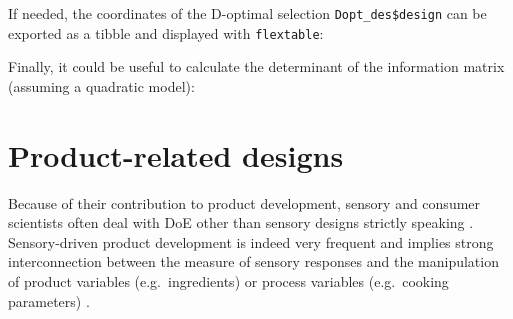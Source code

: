 \documentclass[
]{krantz}
\makeatletter
\newenvironment{Shaded}{\begin{snugshade}}{\end{snugshade}}
\newcommand{\AttributeTok}[1]{\textcolor[rgb]{0.61,0.61,0.61}{#1}}
\newcommand{\DecValTok}[1]{\textcolor[rgb]{0.06,0.06,0.06}{#1}}
\newcommand{\FunctionTok}[1]{\textcolor[rgb]{0,0,0}{#1}}
\newcommand{\NormalTok}[1]{#1}
\newcommand{\OtherTok}[1]{\textcolor[rgb]{0.37,0.37,0.37}{#1}}
\newcommand{\SpecialCharTok}[1]{\textcolor[rgb]{0,0,0}{#1}}
\newcommand{\StringTok}[1]{\textcolor[rgb]{0.5,0.5,0.5}{#1}}
\newenvironment{kframe}{%
\medskip{}
\setlength{\fboxsep}{.8em}
 \def\at@end@of@kframe{}%
 \ifinner\ifhmode%
  \def\at@end@of@kframe{\end{minipage}}%
  \begin{minipage}{\columnwidth}%
 \fi\fi%
 \def\FrameCommand##1{\hskip\@totalleftmargin \hskip-\fboxsep
 \colorbox{shadecolor}{##1}\hskip-\fboxsep
     \hskip-\linewidth \hskip-\@totalleftmargin \hskip\columnwidth}%
 \MakeFramed {\advance\hsize-\width
   \@totalleftmargin\z@ \linewidth\hsize
   \@setminipage}}%
 {\par\unskip\endMakeFramed%
 \at@end@of@kframe}
\renewenvironment{Shaded}{\begin{kframe}}{\end{kframe}}
\makeatother
\begin{document}
If needed, the coordinates of the D-optimal selection \texttt{Dopt\_des\$design} can be exported as a tibble and displayed with \texttt{flextable}:

\begin{Shaded}
\end{Shaded}

Finally, it could be useful to calculate the determinant of the information matrix (assuming a quadratic model):

\begin{Shaded}
\end{Shaded}

\hypertarget{product-related-designs}{%
\section{Product-related designs}\label{product-related-designs}}

Because of their contribution to product development, sensory and consumer scientists often deal with DoE other than sensory designs strictly speaking \citep[see for instance][]{gacula2008design}. Sensory-driven product development is indeed very frequent and implies strong interconnection between the measure of sensory responses and the manipulation of product variables (e.g.~ingredients) or process variables (e.g.~cooking parameters) \citep[for a review, see][]{Yu2018}.
\end{document}
